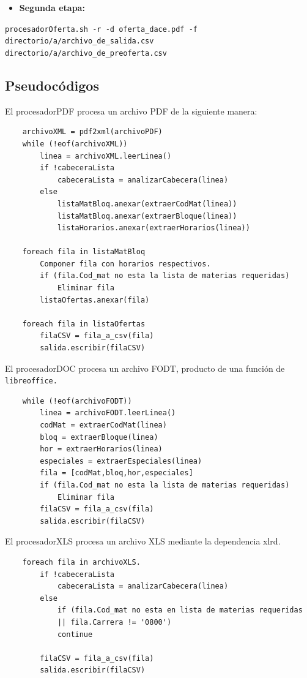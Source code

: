 \documentclass[]{article}
\begin{document}
\begin{itemize}
\itemsep1pt\parskip0pt
\item
  \textbf{Segunda etapa:}
\end{itemize}

\texttt{procesadorOferta.sh -r -d oferta\_dace.pdf      -f directorio/a/archivo\_de\_salida.csv      directorio/a/archivo\_de\_preoferta.csv}

\subsection{Pseudocódigos}\label{pseudocuxf3digos}

El procesadorPDF procesa un archivo PDF de la siguiente manera:

\begin{verbatim}
    archivoXML = pdf2xml(archivoPDF)
    while (!eof(archivoXML))
        linea = archivoXML.leerLinea()
        if !cabeceraLista
            cabeceraLista = analizarCabecera(linea)
        else
            listaMatBloq.anexar(extraerCodMat(linea))
            listaMatBloq.anexar(extraerBloque(linea))
            listaHorarios.anexar(extraerHorarios(linea))

    foreach fila in listaMatBloq
        Componer fila con horarios respectivos.
        if (fila.Cod_mat no esta la lista de materias requeridas)
            Eliminar fila
        listaOfertas.anexar(fila)

    foreach fila in listaOfertas
        filaCSV = fila_a_csv(fila)
        salida.escribir(filaCSV)
\end{verbatim}

El procesadorDOC procesa un archivo FODT, producto de una función de
\texttt{libreoffice.}

\begin{verbatim}
    while (!eof(archivoFODT))
        linea = archivoFODT.leerLinea()
        codMat = extraerCodMat(linea)
        bloq = extraerBloque(linea)
        hor = extraerHorarios(linea)
        especiales = extraerEspeciales(linea)
        fila = [codMat,bloq,hor,especiales]
        if (fila.Cod_mat no esta la lista de materias requeridas)
            Eliminar fila
        filaCSV = fila_a_csv(fila)
        salida.escribir(filaCSV)
\end{verbatim}

El procesadorXLS procesa un archivo XLS mediante la dependencia xlrd.

\begin{verbatim}
    foreach fila in archivoXLS.
        if !cabeceraLista
            cabeceraLista = analizarCabecera(linea)
        else
            if (fila.Cod_mat no esta en lista de materias requeridas
            || fila.Carrera != '0800')
            continue

        filaCSV = fila_a_csv(fila)
        salida.escribir(filaCSV)
\end{verbatim}
\end{document}
